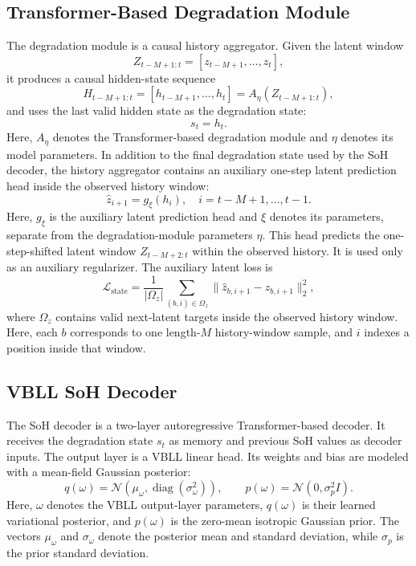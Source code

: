 \documentclass[conference]{IEEEtran}
\begin{document}
\subsection{Transformer-Based Degradation Module}

The degradation module is a causal history aggregator. Given the latent
window
\begin{equation}
Z_{t-M+1:t} = [z_{t-M+1}, \ldots, z_t],
\end{equation}
it produces a causal hidden-state sequence
\begin{equation}
H_{t-M+1:t}
=
[h_{t-M+1}, \ldots, h_t]
=
A_{\eta}(Z_{t-M+1:t}),
\end{equation}
and uses the last valid hidden state as the degradation state:
\begin{equation}
s_t = h_t .
\end{equation}
Here, $A_{\eta}$ denotes the Transformer-based degradation module and $\eta$
denotes its model parameters. In addition to the final degradation state used by
the SoH decoder, the history aggregator contains an auxiliary one-step latent
prediction head inside the observed history window:
\begin{equation}
\hat z_{i+1}=g_{\xi}(h_i),
\quad i=t-M+1,\ldots,t-1 .
\end{equation}
Here, $g_{\xi}$ is the auxiliary latent prediction head and $\xi$ denotes its
parameters, separate from the degradation-module parameters $\eta$. This head
predicts the one-step-shifted latent window $Z_{t-M+2:t}$ within the observed
history. It is used only as an auxiliary regularizer.
The auxiliary latent loss is
\begin{equation}
\mathcal{L}_{\mathrm{state}}
=
\frac{1}{|\Omega_z|}
\sum_{(b,i)\in\Omega_z}
\|\hat z_{b,i+1}-z_{b,i+1}\|_2^2,
\end{equation}
where $\Omega_z$ contains valid next-latent targets inside the observed history
window. Here, each $b$ corresponds to one length-$M$ history-window sample, and
$i$ indexes a position inside that window.

\subsection{VBLL SoH Decoder}

The SoH decoder is a two-layer autoregressive Transformer-based decoder. It
receives the degradation state $s_t$ as memory and previous SoH values as
decoder inputs. The output layer is a VBLL linear head. Its weights and bias are
modeled with a mean-field Gaussian posterior:
\begin{equation}
q(\omega)=\mathcal{N}(\mu_{\omega},\operatorname{diag}(\sigma_{\omega}^2)),
\qquad
p(\omega)=\mathcal{N}(0,\sigma_p^2 I).
\end{equation}
Here, $\omega$ denotes the VBLL output-layer parameters, $q(\omega)$ is their
learned variational posterior, and $p(\omega)$ is the zero-mean isotropic
Gaussian prior. The vectors $\mu_{\omega}$ and $\sigma_{\omega}$ denote the
posterior mean and standard deviation, while $\sigma_p$ is the prior standard
deviation.
\end{document}
